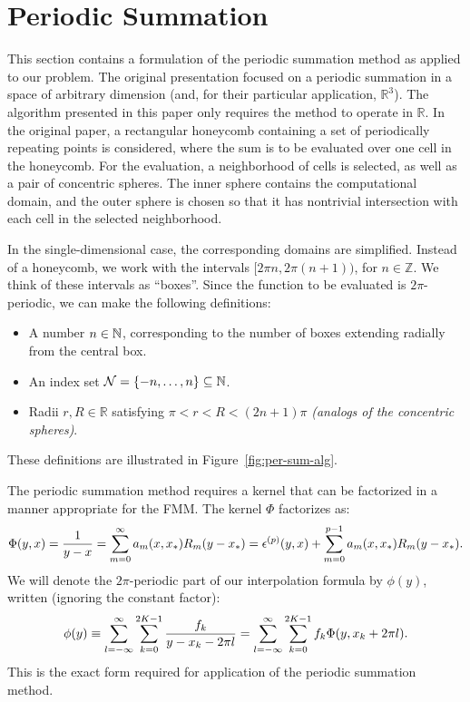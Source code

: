 \section{Periodic Summation}

This section contains a formulation of the periodic summation method
as applied to our problem. The original presentation focused on a
periodic summation in a space of arbitrary dimension (and, for their
particular application, $\mathbb{R}^3$).  The algorithm presented in
this paper only requires the method to operate in $\mathbb{R}$. In the
original paper, a rectangular honeycomb containing a set of
periodically repeating points is considered, where the sum is to be
evaluated over one cell in the honeycomb. For the evaluation, a
neighborhood of cells is selected, as well as a pair of concentric
spheres. The inner sphere contains the computational domain, and the
outer sphere is chosen so that it has nontrivial intersection with
each cell in the selected neighborhood.

In the single-dimensional case, the corresponding domains are
simplified. Instead of a honeycomb, we work with the intervals
$[2\pi n, 2\pi (n + 1))$, for $n \in \mathbb{Z}$. We think of these
intervals as ``boxes''. Since the function to be evaluated is
$2\pi$-periodic, we can make the following definitions:
\begin{itemize}
\item A number $n \in \mathbb{N}$, corresponding to the number of boxes
  extending radially from the central box.
\item An index set
  $\mathcal{N} = \left\{-n, \hdots, n\right\} \subseteq \mathbb{N}$.
\item Radii $r, R \in \mathbb{R}$ satisfying
  $\pi < r < R < (2n + 1)\pi$ \emph{(analogs of the concentric
    spheres)}.
\end{itemize}
These definitions are illustrated in Figure~\ref{fig:per-sum-alg}.

The periodic summation method requires a kernel that can be factorized
in a manner appropriate for the FMM. The kernel $\Phi$ factorizes as:
\begin{align*}
  \Phi(y, x) = {1 \over y - x} = \sum_{m=0}^\infty a_m(x, x_*) R_m(y - x_*) = \epsilon^{(p)}(y,x) + \sum_{m=0}^{p-1} a_m(x, x_*) R_m(y - x_*).
\end{align*}
We will denote the $2\pi$-periodic
part of our interpolation formula by $\phi(y)$,
written (ignoring the constant factor):
\begin{align*}
  \phi(y) \equiv \sum_{l=-\infty}^\infty \sum_{k=0}^{2K-1} {f_k \over y - x_k - 2\pi l} = \sum_{l=-\infty}^\infty \sum_{k=0}^{2K-1} f_k \Phi(y, x_k + 2\pi l).
\end{align*}
This is the exact form required for application of the periodic
summation method.

